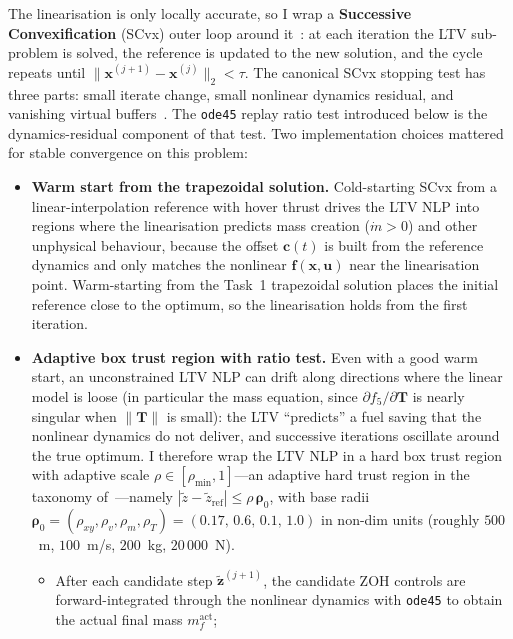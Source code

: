 \documentclass[../main.tex]{subfiles}
\begin{document}
The linearisation is only locally accurate, so I wrap a \textbf{Successive Convexification} (SCvx) outer loop around it~\cite[Lecture~12]{dclvnotes}: at each iteration the LTV sub-problem is solved, the reference is updated to the new solution, and the cycle repeats until $\|\mathbf{x}^{(j+1)} - \mathbf{x}^{(j)}\|_2 < \tau$. The canonical SCvx stopping test has three parts: small iterate change, small nonlinear dynamics residual, and vanishing virtual buffers~\cite[Secs.~3.5--3.7]{benedikter2022}. The \texttt{ode45} replay ratio test introduced below is the dynamics-residual component of that test. Two implementation choices mattered for stable convergence on this problem:
\begin{itemize}
    \item \textbf{Warm start from the trapezoidal solution.} Cold-starting SCvx from a linear-interpolation reference with hover thrust drives the LTV NLP into regions where the linearisation predicts mass creation ($\dot m > 0$) and other unphysical behaviour, because the offset $\mathbf{c}(t)$ is built from the reference dynamics and only matches the nonlinear $\mathbf{f}(\mathbf{x},\mathbf{u})$ near the linearisation point. Warm-starting from the Task~1 trapezoidal solution places the initial reference close to the optimum, so the linearisation holds from the first iteration.
    \item \textbf{Adaptive box trust region with ratio test.} Even with a good warm start, an unconstrained LTV NLP can drift along directions where the linear model is loose (in particular the mass equation, since $\partial f_5/\partial \mathbf{T}$ is nearly singular when $\|\mathbf{T}\|$ is small): the LTV ``predicts'' a fuel saving that the nonlinear dynamics do not deliver, and successive iterations oscillate around the true optimum. I therefore wrap the LTV NLP in a hard box trust region with adaptive scale $\rho \in [\rho_{\min}, 1]$---an adaptive hard trust region in the taxonomy of~\cite[Secs.~3.5--3.7]{benedikter2022}---namely $|\tilde{z} - \tilde{z}_{\mathrm{ref}}| \leq \rho\,\boldsymbol{\rho}_0$, with base radii $\boldsymbol{\rho}_0 = (\rho_{xy}, \rho_v, \rho_m, \rho_T) = (0.17,\,0.6,\,0.1,\,1.0)$ in non-dim units (roughly $500$~m, $100$~m/s, $200$~kg, $20\,000$~N).
    \begin{itemize}
        \item After each candidate step $\tilde{\mathbf{z}}^{(j+1)}$, the candidate ZOH controls are forward-integrated through the nonlinear dynamics with \texttt{ode45} to obtain the actual final mass $m_f^{\mathrm{act}}$;

\end{itemize}
\end{itemize}
\end{document}
